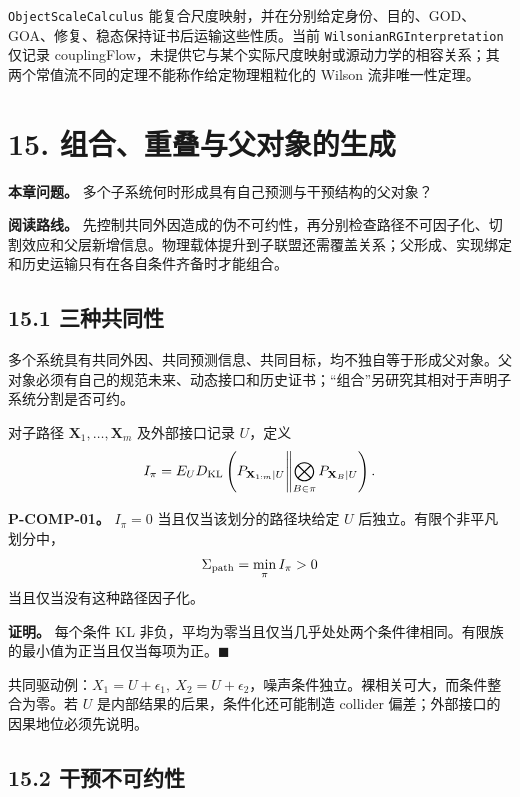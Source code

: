 \documentclass[
  11pt,
  oneside]{book}
\begin{document}
\nolinkurl{ObjectScaleCalculus} 能复合尺度映射，并在分别给定身份、目的、GOD、GOA、修复、稳态保持证书后运输这些性质。当前 \nolinkurl{WilsonianRGInterpretation} 仅记录 couplingFlow，未提供它与某个实际尺度映射或源动力学的相容关系；其两个常值流不同的定理不能称作给定物理粗粒化的 Wilson 流非唯一性定理。

\chapter{15. 组合、重叠与父对象的生成}\label{ch-15}

\textbf{本章问题。} 多个子系统何时形成具有自己预测与干预结构的父对象？

\textbf{阅读路线。} 先控制共同外因造成的伪不可约性，再分别检查路径不可因子化、切割效应和父层新增信息。物理载体提升到子联盟还需覆盖关系；父形成、实现绑定和历史运输只有在各自条件齐备时才能组合。

\section{15.1 三种共同性}\label{ux4e09ux79cdux5171ux540cux6027}

多个系统具有共同外因、共同预测信息、共同目标，均不独自等于形成父对象。父对象必须有自己的规范未来、动态接口和历史证书；``组合''另研究其相对于声明子系统分割是否可约。

对子路径 \(\mathbf X_1,\ldots,\mathbf X_m\) 及外部接口记录 \(U\)，定义 \[I_\pi=
E_U D_{\rm KL}\left(P_{\mathbf X_{1:m}\mid U}
\middle\|\bigotimes_{B\in\pi}P_{\mathbf X_B\mid U}\right).\]

\hypertarget{p-comp-01}{}\label{p-comp-01}

\textbf{P-COMP-01。} \(I_\pi=0\) 当且仅当该划分的路径块给定 \(U\) 后独立。有限个非平凡划分中， \[\Sigma_{\rm path}=\min_\pi I_\pi>0\] 当且仅当没有这种路径因子化。

\textbf{证明。} 每个条件 KL 非负，平均为零当且仅当几乎处处两个条件律相同。有限族的最小值为正当且仅当每项为正。\(\blacksquare\)

共同驱动例：\(X_1=U+\epsilon_1,\ X_2=U+\epsilon_2\)，噪声条件独立。裸相关可大，而条件整合为零。若 \(U\) 是内部结果的后果，条件化还可能制造 collider 偏差；外部接口的因果地位必须先说明。

\section{15.2 干预不可约性}\label{ux5e72ux9884ux4e0dux53efux7ea6ux6027}
\end{document}
